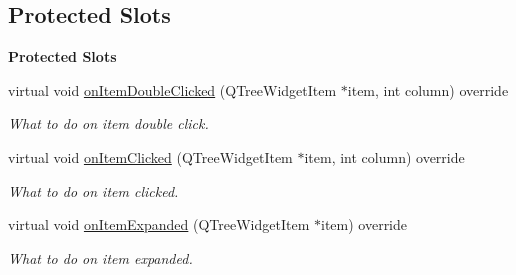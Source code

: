 \subsection*{Protected Slots}
\begin{Indent}\textbf{ Protected Slots}\par
\begin{DoxyCompactItemize}
\item 
\mbox{\label{classrev_1_1_view_1_1_scene_tree_widget_ae245301cca5b54639fb5849eee42c932}} 
virtual void \mbox{\hyperlink{classrev_1_1_view_1_1_scene_tree_widget_ae245301cca5b54639fb5849eee42c932}{on\+Item\+Double\+Clicked}} (Q\+Tree\+Widget\+Item $\ast$item, int column) override
\begin{DoxyCompactList}\small\item\em What to do on item double click. \end{DoxyCompactList}\item 
\mbox{\label{classrev_1_1_view_1_1_scene_tree_widget_a619be87616400d58992b943015d56486}} 
virtual void \mbox{\hyperlink{classrev_1_1_view_1_1_scene_tree_widget_a619be87616400d58992b943015d56486}{on\+Item\+Clicked}} (Q\+Tree\+Widget\+Item $\ast$item, int column) override
\begin{DoxyCompactList}\small\item\em What to do on item clicked. \end{DoxyCompactList}\item 
\mbox{\label{classrev_1_1_view_1_1_scene_tree_widget_aa8535dd4a9dc759961862717c3899b29}} 
virtual void \mbox{\hyperlink{classrev_1_1_view_1_1_scene_tree_widget_aa8535dd4a9dc759961862717c3899b29}{on\+Item\+Expanded}} (Q\+Tree\+Widget\+Item $\ast$item) override
\begin{DoxyCompactList}\small\item\em What to do on item expanded. \end{DoxyCompactList}\end{DoxyCompactItemize}
\end{Indent}

